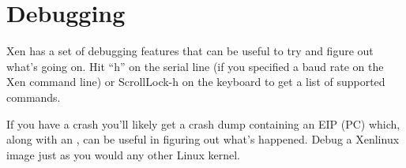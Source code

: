 \chapter{Debugging}

Xen has a set of debugging features that can be useful to try and figure
out what's going on. Hit ``h'' on the serial line (if you specified a baud
rate on the Xen command line) or ScrollLock-h on the keyboard to get a
list of supported commands.

If you have a crash you'll likely get a crash dump containing an EIP
(PC) which, along with an , can be useful in
figuring out what's happened. Debug a Xenlinux image just as you would
any other Linux kernel.

